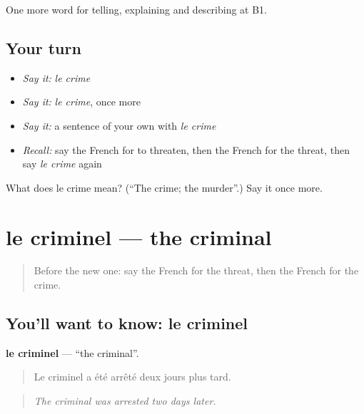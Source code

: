 \begin{grammarlens}[title={What you've built}]
One more word for telling, explaining and describing at B1.
\end{grammarlens}

\subsection*{Your turn}
\begin{itemize}
\raggedright
  \item \emph{Say it:} \emph{le crime}
  \item \emph{Say it:} \emph{le crime}, once more
  \item \emph{Say it:} a sentence of your own with \emph{le crime}
  \item \emph{Recall:} say the French for to threaten, then the French for the threat, then say \emph{le crime} again
\end{itemize}

\begin{tcolorbox}[breakable,colback=teal!4,colframe=teal!35!black,title={Before you move on}]
What does le crime mean? (\textquotedblleft{}The crime; the murder\textquotedblright{}.) Say it once more.
\end{tcolorbox}
\section[le criminel]{le criminel — the criminal}

\label{lesson:FR-C290-criminel}



\begin{quote}
Before the new one: say the French for the threat, then the French for the crime.
\end{quote}

\subsection*{You'll want to know: le criminel}
\textbf{le criminel} — \textquotedblleft{}the criminal\textquotedblright{}.

\begin{quote}
Le criminel a été arrêté deux jours plus tard.
\end{quote}

\begin{quote}
\emph{The criminal was arrested two days later.}
\end{quote}

